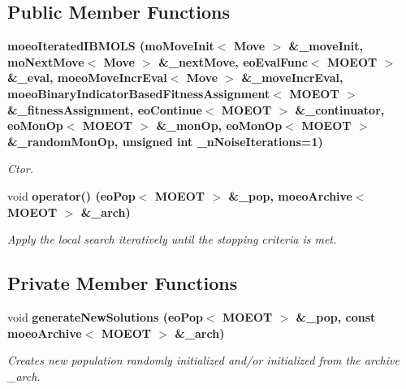 \subsection*{Public Member Functions}
\begin{CompactItemize}
\item 
\bf{moeo\-Iterated\-IBMOLS} (mo\-Move\-Init$<$ Move $>$ \&\_\-move\-Init, mo\-Next\-Move$<$ Move $>$ \&\_\-next\-Move, \bf{eo\-Eval\-Func}$<$ MOEOT $>$ \&\_\-eval, \bf{moeo\-Move\-Incr\-Eval}$<$ Move $>$ \&\_\-move\-Incr\-Eval, \bf{moeo\-Binary\-Indicator\-Based\-Fitness\-Assignment}$<$ MOEOT $>$ \&\_\-fitness\-Assignment, \bf{eo\-Continue}$<$ MOEOT $>$ \&\_\-continuator, \bf{eo\-Mon\-Op}$<$ MOEOT $>$ \&\_\-mon\-Op, \bf{eo\-Mon\-Op}$<$ MOEOT $>$ \&\_\-random\-Mon\-Op, unsigned int \_\-n\-Noise\-Iterations=1)
\begin{CompactList}\small\item\em Ctor. \item\end{CompactList}\item 
void \bf{operator()} (\bf{eo\-Pop}$<$ MOEOT $>$ \&\_\-pop, \bf{moeo\-Archive}$<$ MOEOT $>$ \&\_\-arch)
\begin{CompactList}\small\item\em Apply the local search iteratively until the stopping criteria is met. \item\end{CompactList}\end{CompactItemize}
\subsection*{Private Member Functions}
\begin{CompactItemize}
\item 
void \bf{generate\-New\-Solutions} (\bf{eo\-Pop}$<$ MOEOT $>$ \&\_\-pop, const \bf{moeo\-Archive}$<$ MOEOT $>$ \&\_\-arch)
\begin{CompactList}\small\item\em Creates new population randomly initialized and/or initialized from the archive \_\-arch. \item\end{CompactList}\end{CompactItemize}
